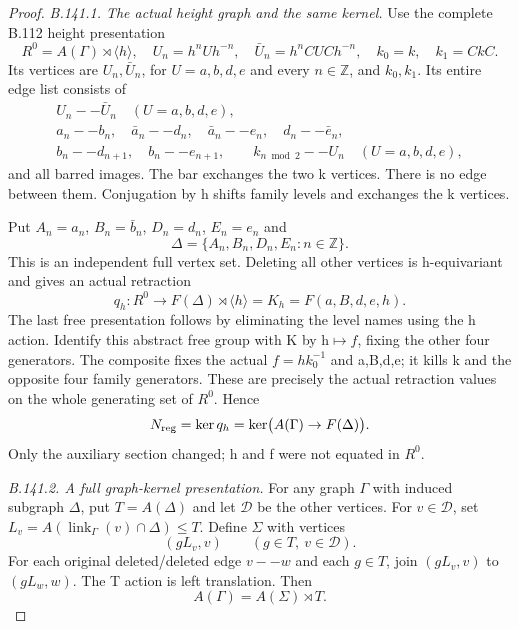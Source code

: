 \begin{proof}
\emph{B.141.1. The actual height graph and the same kernel.}
Use the complete B.112 height presentation
\[
R^0=A(\Gamma)\rtimes\langle h\rangle,
\quad U_n=h^nUh^{-n},\quad\bar U_n=h^nCUCh^{-n},
\quad k_0=k,\quad k_1=CkC.
\]
Its vertices are $U_n,\bar U_n$, for $U=a,b,d,e$ and every
$n\in\mathbb Z$, and $k_0,k_1$. Its entire edge list consists of
\begin{equation}\label{eq:B141-original-edges}
\begin{gathered}
U_n--\bar U_n\quad(U=a,b,d,e),\\
a_n--b_n,\quad\bar a_n--d_n,\quad
\bar a_n--e_n,\quad d_n--\bar e_n,\\
b_n--d_{n+1},\quad b_n--e_{n+1},\qquad
k_{n\bmod2}--U_n\quad(U=a,b,d,e),
\end{gathered}
\end{equation}
and all barred images. The bar exchanges the two k vertices.
There is no edge between them. Conjugation by h shifts family
levels and exchanges the k vertices.

Put $A_n=a_n$, $B_n=\bar b_n$, $D_n=d_n$, $E_n=e_n$ and
\[
\Delta=\{A_n,B_n,D_n,E_n:n\in\mathbb Z\}.
\]
This is an independent full vertex set. Deleting all other vertices
is h-equivariant and gives an actual retraction
\[
q_h:R^0\to F(\Delta)\rtimes\langle h\rangle
       =K_h=F(a,B,d,e,h).
\]
The last free presentation follows by eliminating the level names
using the h action. Identify this abstract free group with K by
h$\mapsto f$, fixing the other four generators. The composite
fixes the actual $f=hk_0^{-1}$ and a,B,d,e; it kills k and the
opposite four family generators. These are precisely the actual
retraction values on the whole generating set of $R^0$. Hence
\begin{equation}\label{eq:B141-same-kernel}
N_{\rm reg}=\ker q_h=\ker\bigl(A(\Gamma)\to F(\Delta)\bigr).
\end{equation}
Only the auxiliary section changed; h and f were not equated in $R^0$.

\emph{B.141.2. A full graph-kernel presentation.}
For any graph $\Gamma$ with induced subgraph $\Delta$, put
$T=A(\Delta)$ and let $\mathcal D$ be the other vertices.
For $v\in\mathcal D$, set
$L_v=A(\operatorname{link}_\Gamma(v)\cap\Delta)\le T$.
Define $\Sigma$ with vertices
\begin{equation}\label{eq:B141-expanded-vertices}
(gL_v,v)\qquad(g\in T,\ v\in\mathcal D).
\end{equation}
For each original deleted/deleted edge $v--w$ and each $g\in T$,
join $(gL_v,v)$ to $(gL_w,w)$. The T action is left translation.
Then
\begin{equation}\label{eq:B141-general-kernel}
A(\Gamma)=A(\Sigma)\rtimes T.
\end{equation}


\end{proof}
